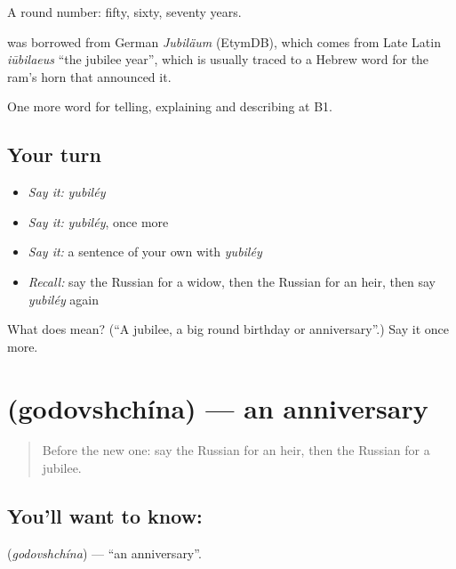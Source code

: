 A round number: fifty, sixty, seventy years.

\begin{cousinweb}
\emph{} was borrowed from German \emph{Jubiläum} (EtymDB), which comes from Late Latin \emph{iūbilaeus} \textquotedblleft{}the jubilee year\textquotedblright{}, which is usually traced to a Hebrew word for the ram's horn that announced it.
\end{cousinweb}

\begin{grammarlens}[title={What you've built}]
One more word for telling, explaining and describing at B1.
\end{grammarlens}

\subsection*{Your turn}
\begin{itemize}
\raggedright
  \item \emph{Say it:} \emph{yubiléy}
  \item \emph{Say it:} \emph{yubiléy}, once more
  \item \emph{Say it:} a sentence of your own with \emph{yubiléy}
  \item \emph{Recall:} say the Russian for a widow, then the Russian for an heir, then say \emph{yubiléy} again
\end{itemize}

\begin{tcolorbox}[breakable,colback=teal!4,colframe=teal!35!black,title={Before you move on}]
What does  mean? (\textquotedblleft{}A jubilee, a big round birthday or anniversary\textquotedblright{}.) Say it once more.
\end{tcolorbox}
\section[\texorpdfstring{\ru{годовщина} (godovshchína)}{годовщина (godovshchína)}]{ (godovshchína) — an anniversary}

\label{lesson:RU-C310-godovshchina}



\begin{quote}
Before the new one: say the Russian for an heir, then the Russian for a jubilee.
\end{quote}

\subsection*{You'll want to know: }
\textbf{} (\emph{godovshchína}) — \textquotedblleft{}an anniversary\textquotedblright{}.

